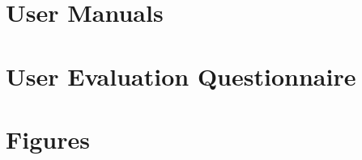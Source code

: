 \begin{appendices}


\chapter{User Manuals}

\chapter{User Evaluation Questionnaire}

\chapter{Figures}



\end{appendices}

